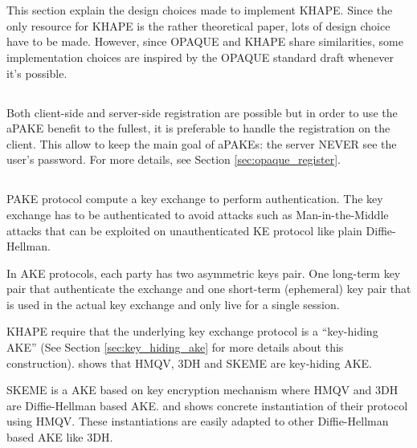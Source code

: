 \documentclass[../report.tex]{subfiles}
\begin{document}
\section{}

This section explain the design choices made to implement KHAPE.
Since the only resource for KHAPE is the rather theoretical paper, lots of design choice have to be made. However, since OPAQUE and KHAPE share similarities, some implementation choices are inspired by the OPAQUE standard draft whenever it's possible.





\subsection{}
Both client-side and server-side registration are possible but in order to use the aPAKE benefit to the fullest, it is preferable to handle the registration on the client.
This allow to keep the main goal of aPAKEs: the server NEVER see the user's password.
For more details, see Section \ref{sec:opaque_register}.





\subsection{}
PAKE protocol compute a key exchange to perform authentication. The key exchange has to be authenticated to avoid attacks such as Man-in-the-Middle attacks that can be exploited on unauthenticated KE protocol like plain Diffie-Hellman.

In AKE protocols, each party has two asymmetric keys pair.
One long-term key pair that authenticate the exchange and one short-term (ephemeral) key pair that is used in the actual key exchange and only live for a single session.


KHAPE require that the underlying key exchange protocol is a ``key-hiding AKE'' (See Section \ref{sec:key_hiding_ake} for more details about this construction).
\cite{KHAPE_Paper} shows that HMQV, 3DH and SKEME are key-hiding AKE.

SKEME is a AKE based on key encryption mechanism where HMQV and 3DH are Diffie-Hellman based AKE.
\cite{OPAQUE_Paper} and \cite{KHAPE_Paper} shows concrete instantiation of their protocol using HMQV. These instantiations are easily adapted to other Diffie-Hellman based AKE like 3DH.
\end{document}
